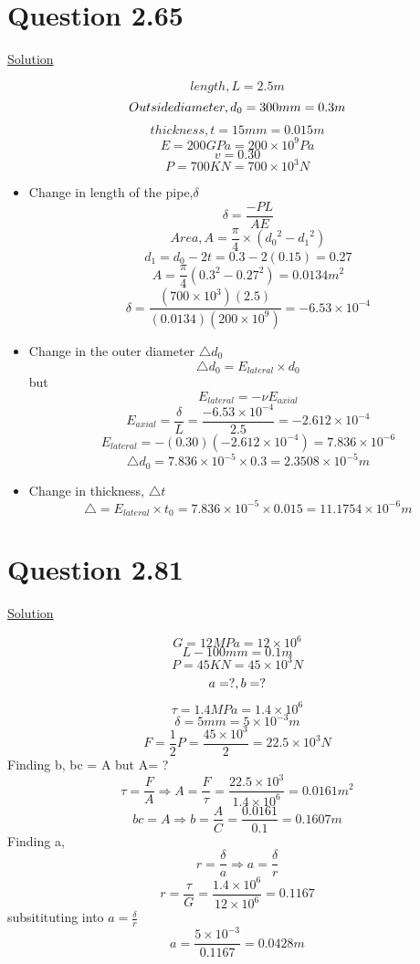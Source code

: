 \documentclass{article}
\begin{document}
\section*{Question 2.65}
\begin{center}\underline{ Solution}\end{center}
\[length, L = 2.5m\]
\[Outside\space diameter, d_{0} = 300mm = 0.3m\]
\[thickness, t =15mm = 0.015m\]
\[E = 200GPa = 200\times10^{9}Pa\]
\[v=0.30\]
\[P = 700KN = 700\times10^{3}N\]
\begin{itemize}
\item Change in length of the pipe,$\delta$
\[\delta  = \frac{-PL}{AE}\]
\[Area, A = \frac{\pi}{4}\times({{d_{0}}^{2}} - {{d_{1}}^{2}})\]
\[d_{1} = d_{0} - 2t = 0.3-2(0.15)=0.27\]
\[A = \frac{\pi}{4}(0.3^{2} - 0.27^{2}) = 0.0134m^{2}\]
\[\delta = \frac{(700\times10^{3})(2.5)}{(0.0134)(200\times10^{9})} = -6.53\times10^{-4}\]
\item Change in the outer diameter $\triangle d_{0}$
\[\triangle d_{0} = E_{lateral} \times d_{0}\]
but 
\[E_{lateral} = -\nu E_{axial}\]
\[E_{axial} = \frac{\delta}{L} = \frac{-6.53\times 10^{-4}}{2.5}=-2.612\times10^{-4}\]
\[E_{lateral} = -(0.30)(-2.612\times10^{-4}) = 7.836\times10^{-6}\]
\[\triangle d_{0} = 7.836\times10^{-5}\times0.3=2.3508\times10^{-5}m\]
\item Change in thickness, $\triangle t$
\[\triangle = E_{lateral} \times t_{0}= 7.836\times10^{-5}\times0.015=11.1754\times10^{-6}m\]

\end{itemize}





\section*{Question 2.81}
\begin{center} \underline{Solution}\end{center}
\[G = 12MPa = 12\times10^{6}\]
\[L - 100mm = 0.1m\]
\[P = 45KN = 45\times10^{3}N\]
\[a = ?, \space b=?\]
\[\tau = 1.4MPa = 1.4\times10^{6}\]
\[\delta = 5mm = 5\times10^{-3}m\]
\[F = \frac{1}{2}P = \frac{45\times10^{3}}{2} = 22.5\times10^{3}N\]
Finding b, bc = A but A= ? \[\tau = \frac{F}{A} \Rightarrow A= \frac{F}{\tau} = \frac{22.5\times10^{3}}{1.4\times10^{6}} = 0.0161m^{2}\]
\[bc=A \Rightarrow b= \frac{A}{C}=\frac{0.0161}{0.1} = 0.1607m\]
Finding a, \[r = \frac{\delta}{a} \Rightarrow a = \frac{\delta}{r}\]
\[r = \frac{\tau}{G} = \frac{1.4\times10^{6}}{12\times10^{6}}=0.1167\]
subsitituting into $a=\frac{\delta}{r}$
\[a = \frac{5\times10^{-3}}{0.1167} = 0.0428m\]
\end{document}
